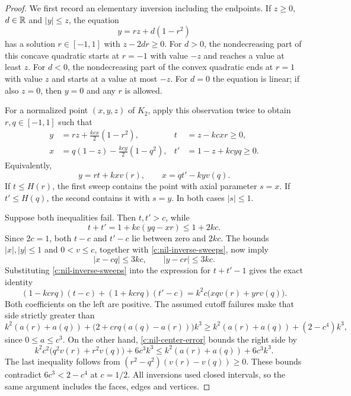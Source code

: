 \begin{proof}
We first record an elementary inversion including the endpoints.
If $z\ge0$, $d\in\mathbb R$ and $|y|\le z$, the equation
\[
 y=rz+d(1-r^2)
\]
has a solution $r\in[-1,1]$ with $z-2dr\ge0$.
For $d>0$, the nondecreasing part of this concave quadratic starts
at $r=-1$ with value $-z$ and reaches a value at least $z$.
For $d<0$, the nondecreasing part of the convex quadratic ends
at $r=1$ with value $z$ and starts at a value at most $-z$.
For $d=0$ the equation is linear; if also $z=0$, then $y=0$
and any $r$ is allowed.

For a normalized point $(x,y,z)$ of $K_2$, apply
this observation twice to obtain $r,q\in[-1,1]$ such that
\begin{equation}\label{c:nil-inversion}
 \begin{aligned}
 y&=rz+\frac{kcx}{2}(1-r^2),
 &t&=z-kcxr\ge0,\\
 x&=q(1-z)-\frac{kcy}{2}(1-q^2),
 &t'&=1-z+kcyq\ge0.
 \end{aligned}
\end{equation}
Equivalently,
\begin{equation}\label{c:nil-inverse-sweeps}
 y=rt+kxv(r),\qquad x=qt'-kyv(q).
\end{equation}
If $t\le H(r)$, the first sweep contains the point with axial
parameter $s=x$.  If $t'\le H(q)$, the second contains it with
$s=y$.  In both cases $|s|\le1$.

Suppose both inequalities fail.  Then $t,t'>c$, while
\[
 t+t'=1+kc(yq-xr)\le1+2kc.
\]
Since $2c=1$, both $t-c$ and $t'-c$ lie between zero and $2kc$.
The bounds $|x|,|y|\le1$ and $0<v\le c$, together with
\eqref{c:nil-inverse-sweeps}, now imply
\begin{equation}\label{c:nil-center-error}
 |x-cq|\le3kc,\qquad |y-cr|\le3kc.
\end{equation}
Substituting \eqref{c:nil-inverse-sweeps} into the expression for
$t+t'-1$ gives the exact identity
\begin{equation}\label{c:nil-overlap-identity}
 (1-kcrq)(t-c)+(1+kcrq)(t'-c)
 =k^2c\bigl(xqv(r)+yrv(q)\bigr).
\end{equation}
Both coefficients on the left are positive.  The assumed cutoff
failures make that side strictly greater than
\[
 k^2(a(r)+a(q))+
 \bigl(2+crq(a(q)-a(r))\bigr)k^3
 \ge k^2(a(r)+a(q))+(2-c^4)k^3,
\]
since $0\le a\le c^3$.  On the other hand,
\eqref{c:nil-center-error} bounds the right side by
\[
 k^2c^2\bigl(q^2v(r)+r^2v(q)\bigr)+6c^3k^3
 \le k^2(a(r)+a(q))+6c^3k^3.
\]
The last inequality follows from
$(r^2-q^2)(v(r)-v(q))\ge0$.
These bounds contradict $6c^3<2-c^4$ at $c=1/2$.
All inversions used closed intervals, so the same argument includes
the faces, edges and vertices.
\end{proof}

